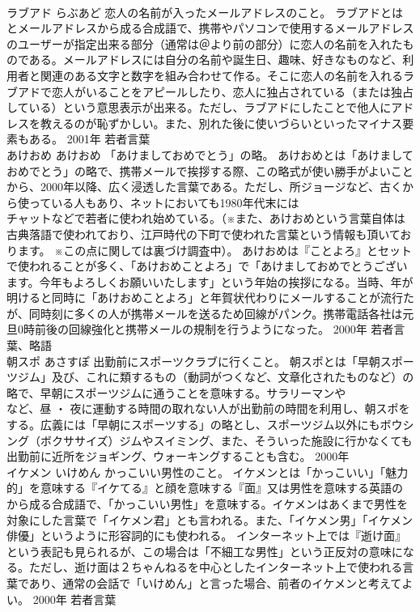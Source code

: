 \documentclass[8pt]{extreport}
\begin{document}
\begin{CJK}{UTF8}{min}
\\	ラブアド	らぶあど	恋人の名前が入ったメールアドレスのこと。	ラブアドとは
\\	とメールアドレスから成る合成語で、携帯やパソコンで使用するメールアドレスのユーザーが指定出来る部分（通常は＠より前の部分）に恋人の名前を入れたものである。メールアドレスには自分の名前や誕生日、趣味、好きなものなど、利用者と関連のある文字と数字を組み合わせて作る。そこに恋人の名前を入れるラブアドで恋人がいることをアピールしたり、恋人に独占されている（または独占している）という意思表示が出来る。ただし、ラブアドにしたことで他人にアドレスを教えるのが恥ずかしい。また、別れた後に使いづらいといったマイナス要素もある。	2001年	若者言葉	
\\	あけおめ	あけおめ	「あけましておめでとう」の略。	あけおめとは「あけましておめでとう」の略で、携帯メールで挨拶する際、この略式が使い勝手がよいことから、2000年以降、広く浸透した言葉である。ただし、所ジョージなど、古くから使っている人もあり、ネットにおいても1980年代末には
\\	チャットなどで若者に使われ始めている。（※また、あけおめという言葉自体は古典落語で使われており、江戸時代の下町で使われた言葉という情報も頂いております。 ※この点に関しては裏づけ調査中）。 あけおめは『ことよろ』とセットで使われることが多く、「あけおめことよろ」で「あけましておめでとうございます。今年もよろしくお願いいたします」という年始の挨拶になる。当時、年が明けると同時に「あけおめことよろ」と年賀状代わりにメールすることが流行たが、同時刻に多くの人が携帯メールを送るため回線がパンク。携帯電話各社は元旦0時前後の回線強化と携帯メールの規制を行うようになった。	2000年	若者言葉、略語	
\\	朝スポ	あさすぽ	出勤前にスポーツクラブに行くこと。	朝スポとは「早朝スポーツジム」及び、これに類するもの（動詞がつくなど、文章化されたものなど）の略で、早朝にスポーツジムに通うことを意味する。サラリーマンや
\\	など、昼 ・ 夜に運動する時間の取れない人が出勤前の時間を利用し、朝スポをする。広義には「早朝にスポーツする」の略とし、スポーツジム以外にもボウシング（ボクササイズ）ジムやスイミング、また、そういった施設に行かなくても出勤前に近所をジョギング、ウォーキングすることも含む。	2000年	
\\	イケメン	いけめん	かっこいい男性のこと。	イケメンとは「かっこいい」「魅力的」を意味する『イケてる』と顔を意味する『面』又は男性を意味する英語の
\\	から成る合成語で、「かっこいい男性」を意味する。イケメンはあくまで男性を対象にした言葉で「イケメン君」とも言われる。また、「イケメン男」「イケメン俳優」というように形容詞的にも使われる。 インターネット上では『逝け面』という表記も見られるが、この場合は「不細工な男性」という正反対の意味になる。ただし、逝け面は２ちゃんねるを中心としたインターネット上で使われる言葉であり、通常の会話で「いけめん」と言った場合、前者のイケメンと考えてよい。	2000年	若者言葉	

\end{CJK}
\end{document}
